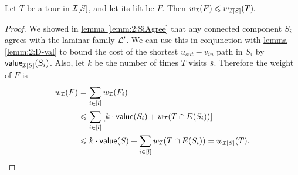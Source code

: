 \documentclass[./main.tex]{subfiles}
\begin{document}
	\begin{lemma}\label{lemm:3:lift-i}
		Let $T$ be a tour in $\mathcal{I}[S]$, and let its lift be $F$. Then $w_{\mathcal{I}}(F) \leqslant w_{\mathcal{I}[S]}(T).$
	\end{lemma}
	\begin{proof}
		We showed in \hyperref[lemm:2:SiAgree]{lemma \ref{lemm:2:SiAgree}} that any connected component $S_i$ agrees with the laminar family $\mathcal{L}'$. We can use this in conjunction with \hyperref[lemm:2:D-val]{lemma \ref{lemm:2:D-val}} to bound the cost of the shortest $u_{out} - v_{in}$ path in $S_i$ by $\textsf{\textup{value}}_{\mathcal{I}[S]}(S_i)$. Also, let $k$ be the number of times $T$ visits $\bar{s}$. Therefore the weight of $F$ is
		\begin{align*}
			w_{\mathcal{I}}(F) &= \sum_{i \in [l]} w_{\mathcal{I}}(F_i)\\
			&\leqslant \sum_{i \in [l]} \left[k\cdot\textsf{\textup{value}}(S_i) + w_{\mathcal{I}}(T \cap E(S_i))\right]\\
			&\leqslant k \cdot\textsf{\textup{value}}(S) + \sum_{i \in [l]}w_{\mathcal{I}}(T \cap E(S_i)) = w_{\mathcal{I}[S]}(T).
		\end{align*}
	\end{proof}
\end{document}
